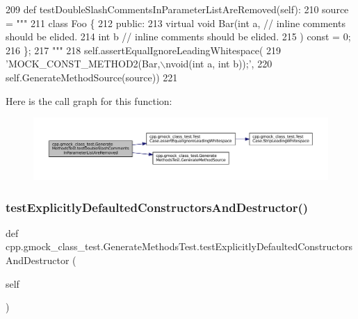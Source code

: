\begin{DoxyCode}
209   \textcolor{keyword}{def }testDoubleSlashCommentsInParameterListAreRemoved(self):
210     source = \textcolor{stringliteral}{"""}
211 \textcolor{stringliteral}{class Foo \{}
212 \textcolor{stringliteral}{ public:}
213 \textcolor{stringliteral}{  virtual void Bar(int a,  // inline comments should be elided.}
214 \textcolor{stringliteral}{                   int b   // inline comments should be elided.}
215 \textcolor{stringliteral}{                   ) const = 0;}
216 \textcolor{stringliteral}{\};}
217 \textcolor{stringliteral}{"""}
218     self.assertEqualIgnoreLeadingWhitespace(
219         \textcolor{stringliteral}{'MOCK\_CONST\_METHOD2(Bar,\(\backslash\)nvoid(int a, int b));'},
220         self.GenerateMethodSource(source))
221 
\end{DoxyCode}
Here is the call graph for this function\+:
\nopagebreak
\begin{figure}[H]
\begin{center}
\leavevmode
\includegraphics[width=350pt]{classcpp_1_1gmock__class__test_1_1GenerateMethodsTest_abb9fce46de4ac1d2943b85e84ce14c83_cgraph}
\end{center}
\end{figure}
\mbox{\label{classcpp_1_1gmock__class__test_1_1GenerateMethodsTest_a0a2a15e9eb43aff0fec7e89a81c30987}} 
\subsubsection{\texorpdfstring{test\+Explicitly\+Defaulted\+Constructors\+And\+Destructor()}{testExplicitlyDefaultedConstructorsAndDestructor()}}
{\footnotesize\ttfamily def cpp.\+gmock\+\_\+class\+\_\+test.\+Generate\+Methods\+Test.\+test\+Explicitly\+Defaulted\+Constructors\+And\+Destructor (\begin{DoxyParamCaption}\item[{}]{self }\end{DoxyParamCaption})}



